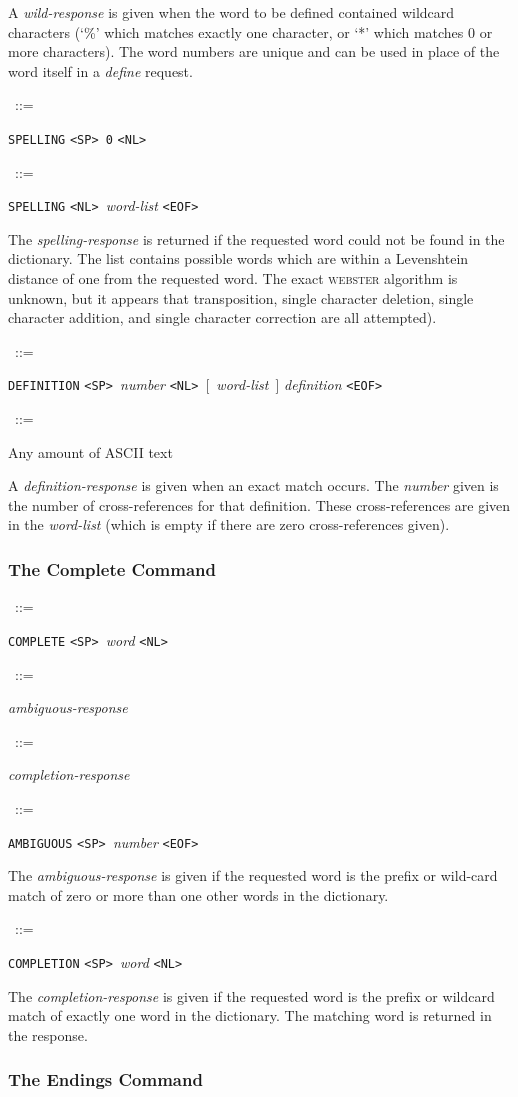 \documentclass{article}
\newcommand{\SP}{\mbox{\tt <SP>\ }}
\newcommand{\NL}{\mbox{\tt <NL>\ }}
\newcommand{\EOF}{\mbox{\tt <EOF>\ }}
\newcommand{\note}{\bigskip\par\noindent}
\newcommand{\prd}[3][]{\noindent\begin{leftline}\hspace{1em}{\it #2}\ ::=\ %
  \begin{minipage}[t]{.64\textwidth}\raggedright #3\end{minipage}%
    \ifthenelse{\equal{#1}{}}{}%
    {\begin{minipage}[t]{.54\textwidth}\raggedright #1\end{minipage}%
      \vspace{1ex}}%
    \end{leftline}}
\newcommand{\opt}[1]{[~#1~]}
\newcommand{\lhs}[1]{{\it #1\/}}
\newcommand{\lit}[1]{{\tt #1}}
\newcommand{\webster}{\textsc{webster}\xspace}
\begin{document}
\note A \lhs{wild-response} is given when the word to be defined contained
wildcard characters (`\%' which matches exactly one character, or `*' which
matches 0 or more characters).  The word numbers are unique and can be used
in place of the word itself in a \lhs{define} request.\note

\prd{spelling-response}{\lit{SPELLING} \SP \lit{0} \NL}
\prd{spelling-response}{\lit{SPELLING} \NL \lhs{word-list} \EOF}

\note The \lhs{spelling-response} is returned if the requested word could
not be found in the dictionary.  The list contains possible words which are
within a Levenshtein distance of one from the requested word.  The exact
\webster algorithm is unknown, but it appears that transposition, single
character deletion, single character addition, and single character
correction are all attempted).\note

\prd{definition-response}{\lit{DEFINITION} \SP \lhs{number}
  \NL \opt{\lhs{word-list}} \lhs{definition} \EOF}
\prd{definition}{Any amount of ASCII text}

\note A \lhs{definition-response} is given when an exact match occurs.  The
\lhs{number} given is the number of cross-references for that definition.
These cross-references are given in the \lhs{word-list} (which is empty if
there are zero cross-references given).


\subsubsection{The Complete Command}

\prd{complete}{\lit{COMPLETE} \SP \lhs{word} \NL}
\prd{complete-response}{\lhs{ambiguous-response}}
\prd{complete-response}{\lhs{completion-response}}

\prd{ambiguous-response}{\lit{AMBIGUOUS} \SP \lhs{number} \EOF}

\note The \lhs{ambiguous-response} is given if the requested word is the
prefix or wild-card match of zero or more than one other words in the
dictionary.\note

\prd{completion-response}{\lit{COMPLETION} \SP \lhs{word} \NL}

\note The \lhs{completion-response} is given if the requested word is the
prefix or wildcard match of exactly one word in the dictionary.  The
matching word is returned in the response.


\subsubsection{The Endings Command}
\end{document}
